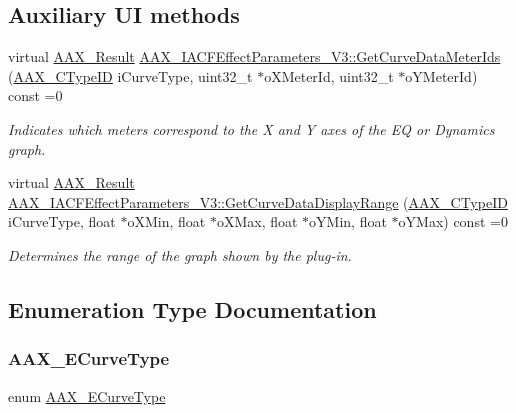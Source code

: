 \subsection*{Auxiliary UI methods}
\begin{DoxyCompactItemize}
\item 
virtual \mbox{\hyperlink{a00392_a4d8f69a697df7f70c3a8e9b8ee130d2f}{A\+A\+X\+\_\+\+Result}} \mbox{\hyperlink{a00812_gac7ba3c1063c35d761fdeba9c9a6cc0d1}{A\+A\+X\+\_\+\+I\+A\+C\+F\+Effect\+Parameters\+\_\+\+V3\+::\+Get\+Curve\+Data\+Meter\+Ids}} (\mbox{\hyperlink{a00392_ac678f9c1fbcc26315d209f71a147a175}{A\+A\+X\+\_\+\+C\+Type\+ID}} i\+Curve\+Type, uint32\+\_\+t $\ast$o\+X\+Meter\+Id, uint32\+\_\+t $\ast$o\+Y\+Meter\+Id) const =0
\begin{DoxyCompactList}\small\item\em Indicates which meters correspond to the X and Y axes of the EQ or Dynamics graph. \end{DoxyCompactList}\item 
virtual \mbox{\hyperlink{a00392_a4d8f69a697df7f70c3a8e9b8ee130d2f}{A\+A\+X\+\_\+\+Result}} \mbox{\hyperlink{a00812_ga38d1ac0c15a7052904077ef0e2527e0d}{A\+A\+X\+\_\+\+I\+A\+C\+F\+Effect\+Parameters\+\_\+\+V3\+::\+Get\+Curve\+Data\+Display\+Range}} (\mbox{\hyperlink{a00392_ac678f9c1fbcc26315d209f71a147a175}{A\+A\+X\+\_\+\+C\+Type\+ID}} i\+Curve\+Type, float $\ast$o\+X\+Min, float $\ast$o\+X\+Max, float $\ast$o\+Y\+Min, float $\ast$o\+Y\+Max) const =0
\begin{DoxyCompactList}\small\item\em Determines the range of the graph shown by the plug-\/in. \end{DoxyCompactList}\end{DoxyCompactItemize}


\subsection{Enumeration Type Documentation}
\mbox{\label{a00812_ga59c73d8f51c5c55d54a728eff39da884}} 
\subsubsection{\texorpdfstring{AAX\_ECurveType}{AAX\_ECurveType}}
{\footnotesize\ttfamily enum \mbox{\hyperlink{a00812_ga59c73d8f51c5c55d54a728eff39da884}{A\+A\+X\+\_\+\+E\+Curve\+Type}}}



